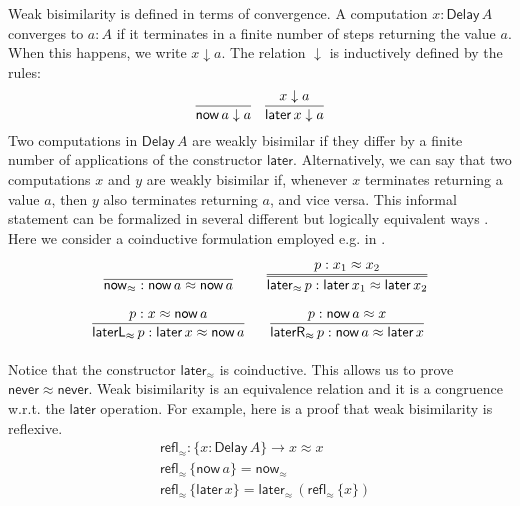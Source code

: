 \documentclass[runningheads,a4paper]{llncs}
\newcommand{\Delay}{\ensuremath{\mathsf{Delay}\,}}
\newcommand{\now}{\mathsf{now}}
\newcommand{\later}{\mathsf{later}}
\newcommand{\laterR}{\mathsf{laterR}}
\newcommand{\laterL}{\mathsf{laterL}}
\newcommand{\never}{\mathsf{never}}
\newcommand{\dn}{\downarrow}
\newcommand{\refl}{\mathsf{refl}}
\begin{document}
Weak bisimilarity is defined in terms of convergence. A computation
$x : \Delay A$ converges to $a : A$ if it terminates in a finite
number of steps returning the value $a$. When this happens, we write
$x \dn a$. The relation $\dn$ is inductively defined by the rules:
\[
\infer{\now\,a \dn a}{}
\quad
\infer{\later\,x \dn a}{x \dn a}
\]
Two computations in $\Delay A$ are weakly bisimilar if they differ by
a finite number of applications of the constructor
$\later$. Alternatively, we can say that two computations $x$ and $y$
are weakly bisimilar if, whenever $x$ terminates returning a value
$a$, then $y$ also terminates returning $a$, and vice versa. This
informal statement can be formalized in several different but
logically equivalent ways \cite{ChapmanUV19,VeltriPhD}. Here we
consider a coinductive formulation employed e.g. in
\cite{Danielsson18}.
\begin{equation}
\label{eq:weak2}
\arraycolsep=8pt\def\arraystretch{2.8}
\begin{array}{cc}
\infer{\now_{\approx}  : \now\,a \approx \now\,a}{}
&
\infer={\later_{\approx} \,p : \later\,x_1 \approx \later\,x_2}{p : x_1 \approx x_2}
\\
\infer{\laterL_{\approx} \, p: \later\,x \approx \now\,a}{p : x \approx \now \,a}
&
\infer{\laterR_{\approx} \, p: \now\,a \approx \later\,x}{p : \now\,a \approx x}
\end{array}
\end{equation}
Notice that the constructor $\later_{\approx}$ is coinductive. This
allows us to prove $\never \approx \never$. 
 Weak bisimilarity is an equivalence relation and it
is a congruence w.r.t. the $\later$ operation.  For example, here is a
proof that weak bisimilarity is reflexive.
\begin{align*}
& \refl_{\approx} : \{x : \Delay A\} \to x \approx x \\
& \refl_{\approx} \,\{\now\,a\} = \now_\approx \\
& \refl_{\approx} \,\{\later\,x\} = \later_\approx\,(\refl_\approx \,\{x\})
\end{align*}
\end{document}
